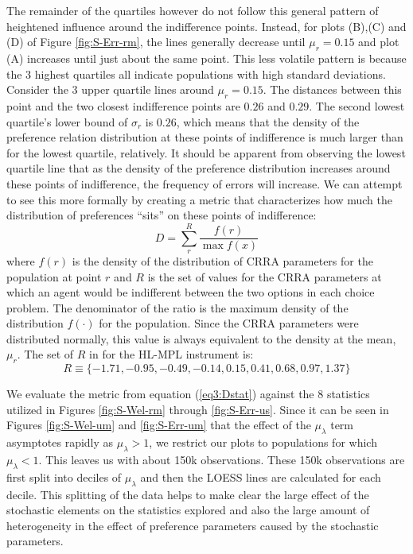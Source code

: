 \documentclass[../main.tex]{subfiles}
\begin{document}
The remainder of the quartiles however do not follow this general pattern of heightened influence around the indifference points.
Instead, for plots (B),(C) and (D) of Figure \ref{fig:S-Err-rm}, the lines generally decrease until $\mu_r = 0.15$ and plot (A) increases until just about the same point.
This less volatile pattern is because the 3 highest quartiles all indicate populations with high standard deviations.
Consider the 3 upper quartile lines around $\mu_r = 0.15$.
The distances between this point and the two closest indifference points are $0.26$ and $0.29$.
The second lowest quartile's lower bound of $\sigma_r$ is $0.26$, which means that the density of the preference relation distribution at these points of indifference is much larger than for the lowest quartile, relatively.
It should be apparent from observing the lowest quartile line that as the density of the preference distribution increases around these points of indifference, the frequency of errors will increase.
We can attempt to see this more formally by creating a metric that characterizes how much the distribution of preferences \enquote{sits} on these points of indifference:
\begin{equation}
	\label{eq3:Dstat}
	D = \sum_r^R \frac{f(r)}{\max f(x)}
\end{equation}
\noindent where $f(r)$ is the density of the distribution of CRRA parameters for the population at point $r$ and $R$ is the set of values for the CRRA parameters at which an agent would be indifferent between the two options in each choice problem.
The denominator of the ratio is the maximum density of the distribution $f(\cdot)$ for the population.
Since the CRRA parameters were distributed normally, this value is always equivalent to the density at the mean, $\mu_r$.
The set of $R$ in for the HL-MPL instrument is:
\begin{equation}
	R \equiv \{-1.71, -0.95, -0.49, -0.14, 0.15, 0.41, 0.68, 0.97, 1.37\}
\end{equation}

We evaluate the metric from equation (\ref{eq3:Dstat}) against the 8 statistics utilized in Figures \ref{fig:S-Wel-rm} through \ref{fig:S-Err-us}.
Since it can be seen in Figures \ref{fig:S-Wel-um} and \ref{fig:S-Err-um} that the effect of the $\mu_\lambda$ term asymptotes rapidly as $\mu_\lambda > 1$, we restrict our plots to populations for which $\mu_\lambda < 1$.
This leaves us with about 150k observations.
These 150k observations are first split into deciles of $\mu_\lambda$ and then the LOESS lines are calculated for each decile.
This splitting of the data helps to make clear the large effect of the stochastic elements on the statistics explored and also the large amount of heterogeneity in the effect of preference parameters caused by the stochastic parameters.
\end{document}
